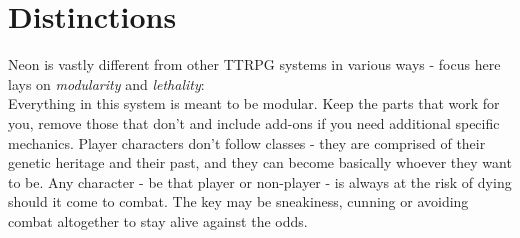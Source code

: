 \documentclass[12pt,a4paper,openany,usenames,dvipsnames]{book}
\begin{document}
	

	\chapter{Distinctions}
	Neon is vastly different from other TTRPG systems in various ways - focus here lays on \emph{modularity} and \emph{lethality}:\\
	Everything in this system is meant to be modular.
	Keep the parts that work for you,
		remove those that don't
		and include add-ons if you need additional specific mechanics.
	Player characters don't follow classes - they are comprised of their genetic heritage and their past,
		and they can become basically whoever they want to be.
	Any character - be that player or non-player - is always at the risk of dying should it come to combat.
	The key may be sneakiness, cunning or avoiding combat altogether to stay alive against the odds.\\
\end{document}
